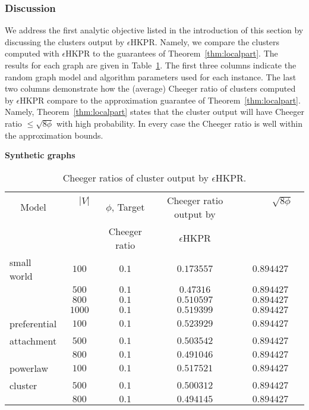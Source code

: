 \documentclass[runningheads,a4paper]{llncs}
\begin{document}
\subsubsection{Discussion} We address the first analytic objective listed in the
introduction of this section by discussing the clusters output by
$\epsilon$HKPR.  Namely, we compare the clusters computed with $\epsilon$HKPR to
the guarantees of Theorem~\ref{thm:localpart}.  The results for each graph are
given in Table~\ref{table:synthhkprclusterresults}.  The first three columns
indicate the random graph model and algorithm parameters used for each instance.
The last two columns demonstrate how the (average) Cheeger ratio of clusters
computed by $\epsilon$HKPR compare to the approximation guarantee of
Theorem~\ref{thm:localpart}.  Namely, Theorem~\ref{thm:localpart} states that
the cluster output will have Cheeger ratio $\leq \sqrt{8\phi}$ with high
probability.  In every case the Cheeger ratio is well within the approximation
bounds.

\begin{table}
\centering
\textbf{Synthetic graphs}\\
\begin{tabular}{|p{2.6cm}|c|c|c|c|}
\hline
\multicolumn{1}{|c|}{Model} & ~~$|V|$~~  & $\phi$, Target & Cheeger ratio output by &
~~~~~$\sqrt{8\phi}$~~~~~\\
             &            & Cheeger ratio & $\epsilon$HKPR          & \\
\hline\hline
small world  & $100$   & $0.1$ & $0.173557$ & $0.894427$\\
             & $500$   & $0.1$ & $0.47316$ & $0.894427$\\
             & $800$   & $0.1$ & $0.510597$ & $0.894427$\\
             & $1000$  & $0.1$ & $0.519399$ & $0.894427$\\\hline
preferential & $100$   & $0.1$ & $0.523929$ & $0.894427$\\
attachment   & $500$   & $0.1$ & $0.503542$ & $0.894427$\\
             & $800$   & $0.1$ & $0.491046$ & $0.894427$\\\hline
powerlaw     & $100$   & $0.1$ & $0.517521$ & $0.894427$\\
cluster      & $500$   & $0.1$ & $0.500312$ & $0.894427$\\
             & $800$   & $0.1$ & $0.494145$ & $0.894427$\\
\hline 
\end{tabular}
\caption{Cheeger ratios of cluster output by $\epsilon$HKPR.}
\label{table:synthhkprclusterresults}
\end{table}
\end{document}
